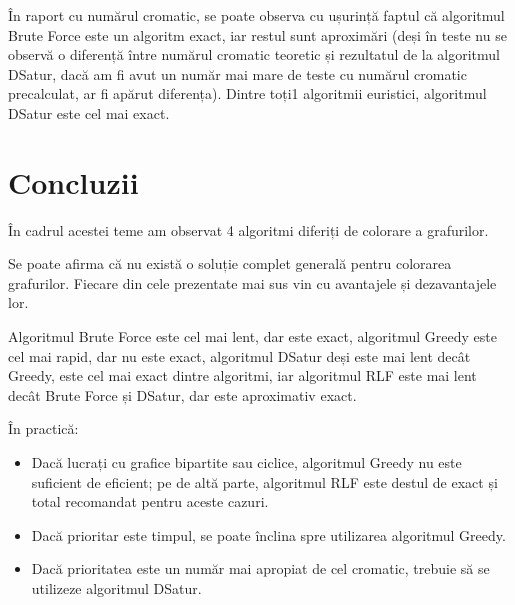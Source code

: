 \documentclass[runningheads]{llncs}
\begin{document}
În raport cu numărul cromatic, se poate observa cu ușurință faptul că algoritmul
Brute Force este un algoritm exact, iar restul sunt aproximări (deși în teste 
nu se observă o diferență între numărul cromatic teoretic și rezultatul de la algoritmul DSatur, dacă
am fi avut un număr mai mare de teste cu numărul cromatic precalculat, ar fi apărut diferența).
Dintre toți1 algoritmii euristici, algoritmul DSatur este cel mai exact.

\section{Concluzii}
În cadrul acestei teme am observat 4 algoritmi diferiți de colorare a grafurilor.

Se poate afirma că nu există o soluție complet generală pentru colorarea grafurilor.
Fiecare din cele prezentate mai sus vin cu avantajele și dezavantajele lor.

Algoritmul Brute Force este cel mai lent, dar este exact, algoritmul Greedy este
cel mai rapid, dar nu este exact, algoritmul DSatur deși este mai lent decât Greedy,
este cel mai exact dintre algoritmi, iar algoritmul RLF este mai lent decât Brute Force și 
DSatur, dar este aproximativ exact.

În practică:
\begin{itemize}
    \item Dacă lucrați cu grafice bipartite sau ciclice, algoritmul Greedy nu este
    suficient de eficient; pe de altă parte, algoritmul RLF este destul de exact și total
    recomandat pentru aceste cazuri.
    \item Dacă prioritar este timpul, se poate înclina spre utilizarea algoritmul Greedy.
    \item Dacă prioritatea este un număr mai apropiat de cel cromatic, trebuie
    să se utilizeze algoritmul DSatur.

\end{itemize}
\pagebreak
\end{document}
